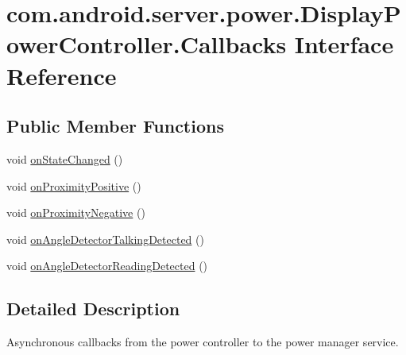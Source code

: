 \hypertarget{interfacecom_1_1android_1_1server_1_1power_1_1DisplayPowerController_1_1Callbacks}{\section{com.\-android.\-server.\-power.\-Display\-Power\-Controller.\-Callbacks Interface Reference}
\label{interfacecom_1_1android_1_1server_1_1power_1_1DisplayPowerController_1_1Callbacks}
}
\subsection*{Public Member Functions}
\begin{DoxyCompactItemize}
\item 
void \hyperlink{interfacecom_1_1android_1_1server_1_1power_1_1DisplayPowerController_1_1Callbacks_a835253ee700d0bc38de6dd75f02fbb89}{on\-State\-Changed} ()
\item 
void \hyperlink{interfacecom_1_1android_1_1server_1_1power_1_1DisplayPowerController_1_1Callbacks_ac409b04585db7e8c3dba79a9e341608e}{on\-Proximity\-Positive} ()
\item 
void \hyperlink{interfacecom_1_1android_1_1server_1_1power_1_1DisplayPowerController_1_1Callbacks_aa99816ae70cdf6fdeea318054a18319a}{on\-Proximity\-Negative} ()
\item 
void \hyperlink{interfacecom_1_1android_1_1server_1_1power_1_1DisplayPowerController_1_1Callbacks_a9d3ddfd702875172756518fadf5c7563}{on\-Angle\-Detector\-Talking\-Detected} ()
\item 
void \hyperlink{interfacecom_1_1android_1_1server_1_1power_1_1DisplayPowerController_1_1Callbacks_a27ae924ac862c1eaa29c9a63b309eee6}{on\-Angle\-Detector\-Reading\-Detected} ()
\end{DoxyCompactItemize}


\subsection{Detailed Description}
Asynchronous callbacks from the power controller to the power manager service. 

